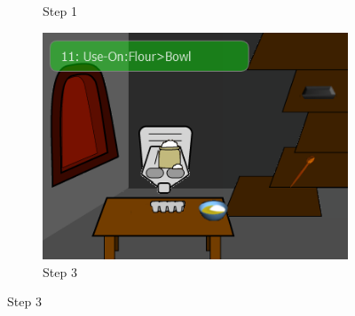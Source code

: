 \begin{figure}[ht]
\begin{subfigure}[b]{0.3\textwidth}
		\caption{Step 1}
		\label{img:bowl}
	\end{subfigure}
	\centering
	\begin{subfigure}[b]{0.3\textwidth}
		\centering
		\includegraphics[width=\textwidth]{step3.png}
		\caption{Step 3}
		\label{img:ingredients}
	\end{subfigure}
	

\end{figure}
